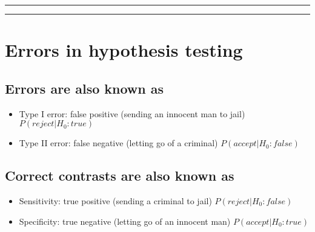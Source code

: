 \documentclass[
]{book}
\begin{document}
\begin{center}\rule{0.5\linewidth}{0.5pt}\end{center}

\begin{center}\rule{0.5\linewidth}{0.5pt}\end{center}

\hypertarget{errors-in-hypothesis-testing-2}{%
\section{Errors in hypothesis testing}\label{errors-in-hypothesis-testing-2}}

\hypertarget{errors-are-also-known-as}{%
\subsection{Errors are also known as}\label{errors-are-also-known-as}}

\begin{itemize}
\item
  Type I error: false positive (sending an innocent man to jail)
  \(P(reject|H_0:true)\)
\item
  Type II error: false negative (letting go of a criminal)
  \(P(accept|H_0:false)\)
\end{itemize}

\hypertarget{correct-contrasts-are-also-known-as}{%
\subsection{Correct contrasts are also known as}\label{correct-contrasts-are-also-known-as}}

\begin{itemize}
\item
  Sensitivity: true positive (sending a criminal to jail)
  \(P(reject|H_0:false)\)
\item
  Specificity: true negative (letting go of an innocent man)
  \(P(accept|H_0:true)\)
\end{itemize}
\end{document}
